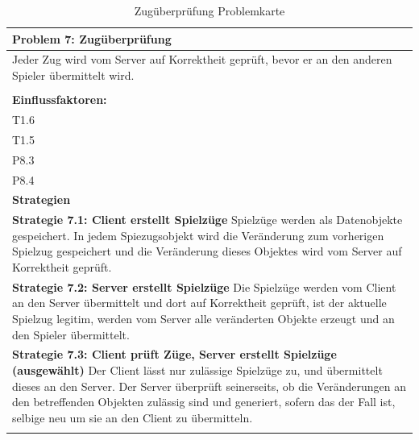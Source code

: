 \documentclass[fontsize=12pt,paper=a4,twoside]{scrartcl}
\begin{document}
\begin{table}[H]
    \centering
    \begin{tabular}{|p{15cm}|}
    \hline
          \textbf{Problem 7: Zugüberprüfung}  \\ \hline
	Jeder Zug wird vom Server auf Korrektheit geprüft, bevor er an den anderen Spieler übermittelt wird. \\
         \\ \hline
          \textbf{Einflussfaktoren: } \\
	T1.6 \\
	T1.5 \\
	P8.3 \\
	P8.4 \\
          \hline
          \textbf{Strategien} \\ \hline
            {}          
           \label{strategie:7.1}     
          \textbf{Strategie 7.1: Client erstellt Spielzüge} Spielzüge werden als Datenobjekte gespeichert. In jedem Spiezugsobjekt wird die Veränderung zum vorherigen Spielzug gespeichert und die Veränderung dieses Objektes wird vom Server auf Korrektheit geprüft.  \\        
  {}          
           \label{strategie:7.2}              
          \textbf{Strategie 7.2: Server erstellt Spielzüge} Die Spielzüge werden vom Client an den Server übermittelt und dort auf Korrektheit geprüft, ist der aktuelle Spielzug legitim, werden vom Server alle veränderten Objekte erzeugt und an den Spieler übermittelt.  \\
	 {}          
           \label{strategie:7.3}     
          \textbf{Strategie 7.3: Client prüft Züge, Server erstellt Spielzüge  (ausgewählt)} Der Client lässt nur zulässige Spielzüge zu, und übermittelt dieses an den Server. Der Server überprüft seinerseits, ob die Veränderungen an den betreffenden Objekten zulässig sind und generiert, sofern das der Fall ist, selbige neu um sie an den Client zu übermitteln.  \\ 
	 \\ \hline
    \end{tabular}

    \caption{Zugüberprüfung Problemkarte}
    \label{tab:ProblemKarte7}
\end{table}
\end{document}
